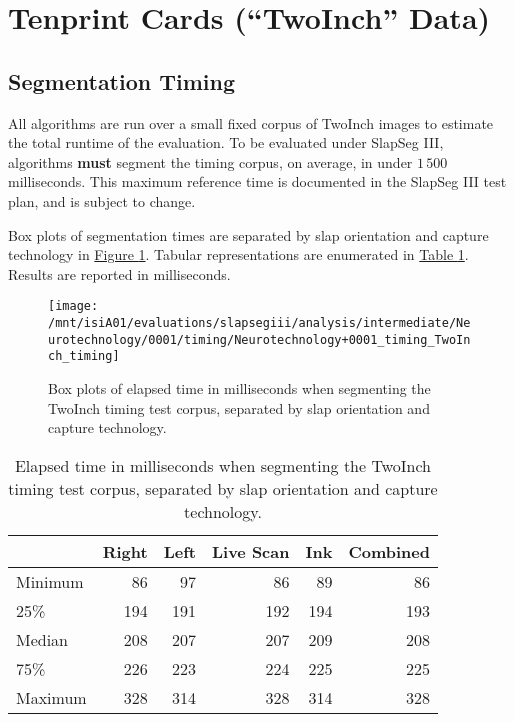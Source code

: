 \documentclass[]{article}
\begin{document}
\clearpage

\section{\texorpdfstring{Tenprint Cards (``TwoInch''
Data)}{Tenprint Cards (TwoInch Data)}}\label{tenprint-cards-twoinch-data}

\subsection{Segmentation Timing}\label{segmentation-timing}

All algorithms are run over a small fixed corpus of TwoInch images to
estimate the total runtime of the evaluation. To be evaluated under
SlapSeg III, algorithms \textbf{must} segment the timing corpus, on
average, in under \(1\,500\) milliseconds. This maximum reference time
is documented in the SlapSeg III test plan, and is subject to change.

Box plots of segmentation times are separated by slap orientation and
capture technology in
\protect\hyperlink{fig:fig-twoinch-timing-tex}{Figure
\ref{fig:fig-twoinch-timing-tex}}. Tabular representations are
enumerated in \protect\hyperlink{tab:tab-twoinch-timing}{Table
\ref{tab:tab-twoinch-timing}}. Results are reported in milliseconds.

\begin{figure}[h]

{\centering \texttt{[image: /mnt/isiA01/evaluations/slapsegiii/analysis/intermediate/Neurotechnology/0001/timing/Neurotechnology+0001\_timing\_TwoInch\_timing]} 

}

\caption{Box plots of elapsed time in milliseconds when segmenting the TwoInch timing test corpus, separated by slap orientation and capture technology.}\label{fig:fig-twoinch-timing-tex}
\end{figure}

\begin{table}[!h]

\caption{\label{tab:tab-twoinch-timing}Elapsed time in milliseconds when segmenting the TwoInch timing test corpus, separated by slap orientation and capture technology.}
\centering
\begin{tabular}{lr>{}r|r>{}r|r}
\toprule
 & Right & Left & Live Scan & Ink & Combined\\
\midrule
\rowcolor{gray!6}  Minimum & 86 & 97 & 86 & 89 & 86\\
25\% & 194 & 191 & 192 & 194 & 193\\
\rowcolor{gray!6}  Median & 208 & 207 & 207 & 209 & 208\\
75\% & 226 & 223 & 224 & 225 & 225\\
\rowcolor{gray!6}  Maximum & 328 & 314 & 328 & 314 & 328\\
\bottomrule
\end{tabular}
\end{table}
\end{document}
